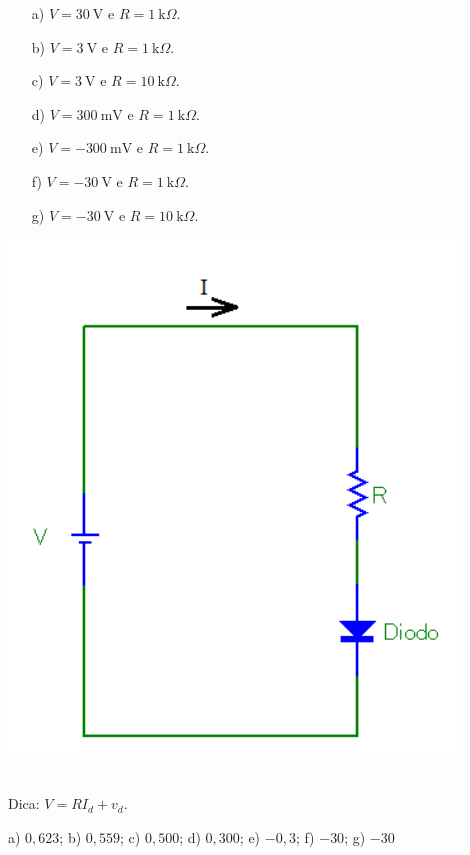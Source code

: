 \begin{minipage}[l]{0.6\linewidth}
\begin{itemize}
\item[a)] $V=30~\mbox{V}$ e $R=1~\mbox{k}\Omega$.
\item[b)] $V=3~\mbox{V}$ e $R=1~\mbox{k}\Omega$.
\item[c)] $V=3~\mbox{V}$ e $R=10~\mbox{k}\Omega$.
\item[d)] $V=300~\mbox{mV}$ e $R=1~\mbox{k}\Omega$.
\item[e)] $V=-300~\mbox{mV}$ e $R=1~\mbox{k}\Omega$.
\item[f)] $V=-30~\mbox{V}$ e $R=1~\mbox{k}\Omega$.
\item[g)] $V=-30~\mbox{V}$ e $R=10~\mbox{k}\Omega$.
\end{itemize}\end{minipage}\begin{minipage}[c]{0.4\linewidth}
\includegraphics[width=0.9\textwidth]{./cap_equacao1d/pics/circuito_diodo.png}
\end{minipage}\\
Dica: $V=RI_d+v_d$.
\begin{Answer}
  \begin{tiny}
    a) $0,623$; b) $0,559$; c) $0,500$; d) $0,300$; e) $-0,3$; f) $-30$; g) $-30$
  \end{tiny}
\end{Answer}


